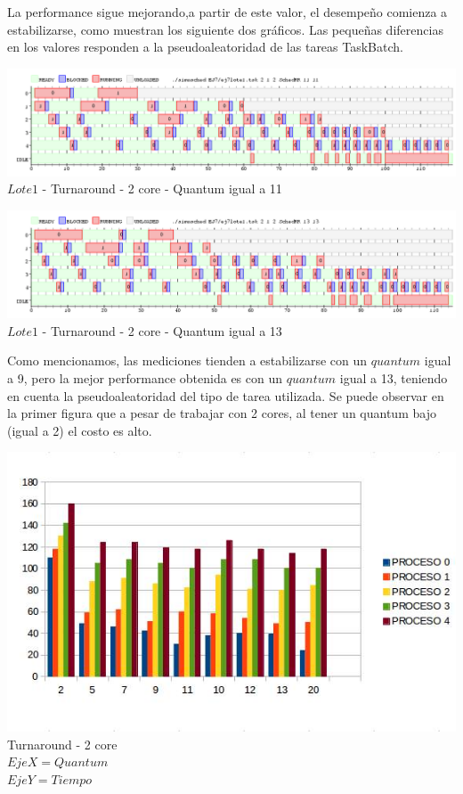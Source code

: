   
   \indent La performance sigue mejorando,a partir de este valor, el desempeño comienza a estabilizarse, como muestran los siguiente dos gráficos. 
   Las pequeñas diferencias en los valores responden a la pseudoaleatoridad de las tareas TaskBatch.\\
  
   \begin{center}
    	\includegraphics[width=450pt]{./EJ7/ej7tour2core5quan.png}
	{$Lote 1$ - Turnaround - 2 core - Quantum igual a 11}	
 \end{center}
 

    \begin{center}
    	\includegraphics[width=450pt]{./EJ7/ej7tour2core8quan.png}
	{$Lote 1$ - Turnaround - 2 core - Quantum igual a 13}	
 \end{center}

 \indent Como mencionamos, las mediciones tienden a estabilizarse con un $quantum$ igual a 9, pero la mejor performance
 obtenida es con un $quantum$ igual a 13, teniendo en cuenta la pseudoaleatoridad del tipo de tarea utilizada.
 \indent Se puede observar en la primer figura que a pesar de trabajar con 2 cores, al tener un quantum bajo (igual a 2) 
 el costo es alto.\\
  
  
 \begin{center}
    	\includegraphics[width=1\textwidth]{./EJ7/tour2core.png}
	{Turnaround - 2 core}	\\
	{$Eje X = Quantum$\\$ Eje Y = Tiempo$}\\
 \end{center} 
 
